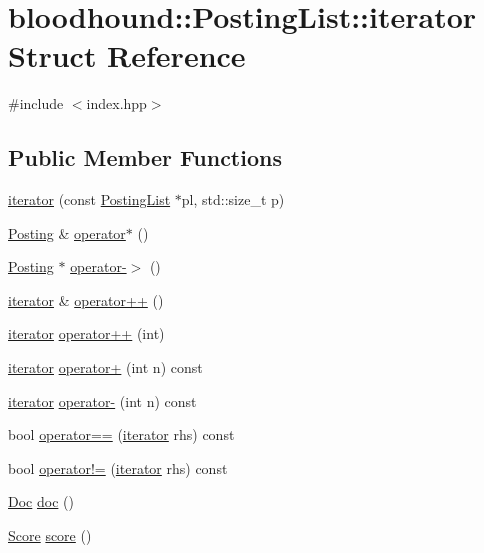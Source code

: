 \hypertarget{structbloodhound_1_1PostingList_1_1iterator}{}\section{bloodhound\+:\+:Posting\+List\+:\+:iterator Struct Reference}
\label{structbloodhound_1_1PostingList_1_1iterator}


{\ttfamily \#include $<$index.\+hpp$>$}

\subsection*{Public Member Functions}
\begin{DoxyCompactItemize}
\item 
\hyperlink{structbloodhound_1_1PostingList_1_1iterator_af815248890d1f92dbd2cc3fa5813875a}{iterator} (const \hyperlink{classbloodhound_1_1PostingList}{Posting\+List} $\ast$pl, std\+::size\+\_\+t p)
\item 
\hyperlink{structbloodhound_1_1Posting}{Posting} \& \hyperlink{structbloodhound_1_1PostingList_1_1iterator_a386a2af6b962ddd85392f1313eb16eff}{operator$\ast$} ()
\item 
\hyperlink{structbloodhound_1_1Posting}{Posting} $\ast$ \hyperlink{structbloodhound_1_1PostingList_1_1iterator_a8c9120139692d6672b52d96301718614}{operator-\/$>$} ()
\item 
\hyperlink{structbloodhound_1_1PostingList_1_1iterator}{iterator} \& \hyperlink{structbloodhound_1_1PostingList_1_1iterator_a8b0c2e4221f0ce3ea893c2fc37edbd53}{operator++} ()
\item 
\hyperlink{structbloodhound_1_1PostingList_1_1iterator}{iterator} \hyperlink{structbloodhound_1_1PostingList_1_1iterator_a9923c5a81b77562a06a48562babcdc9b}{operator++} (int)
\item 
\hyperlink{structbloodhound_1_1PostingList_1_1iterator}{iterator} \hyperlink{structbloodhound_1_1PostingList_1_1iterator_a8672fb454e60ed068ae02078976543f9}{operator+} (int n) const
\item 
\hyperlink{structbloodhound_1_1PostingList_1_1iterator}{iterator} \hyperlink{structbloodhound_1_1PostingList_1_1iterator_a61a5de181ff84ddc0976957a7a9fcfd7}{operator-\/} (int n) const
\item 
bool \hyperlink{structbloodhound_1_1PostingList_1_1iterator_af82060f61f9231ee449e43ea347cab29}{operator==} (\hyperlink{structbloodhound_1_1PostingList_1_1iterator}{iterator} rhs) const
\item 
bool \hyperlink{structbloodhound_1_1PostingList_1_1iterator_aa293b4e0607edaca2fde163c8ee0f00e}{operator!=} (\hyperlink{structbloodhound_1_1PostingList_1_1iterator}{iterator} rhs) const
\item 
\hyperlink{structbloodhound_1_1Doc}{Doc} \hyperlink{structbloodhound_1_1PostingList_1_1iterator_a995d206215c6a01d7a183666502e2628}{doc} ()
\item 
\hyperlink{structbloodhound_1_1Score}{Score} \hyperlink{structbloodhound_1_1PostingList_1_1iterator_a5c94dca7f430ac78f0db3f0fe2c01c75}{score} ()
\end{DoxyCompactItemize}
